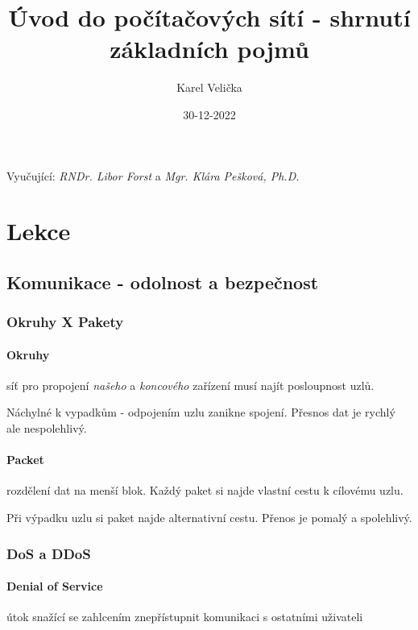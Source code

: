 \documentclass[10pt,a4paper]{article}
\title{Úvod do počítačových sítí - shrnutí základních pojmů}
\date{30-12-2022}
\author{Karel Velička}
\begin{document}
\maketitle

\begin{center}
    Vyučující: \textit{RNDr. Libor Forst} a \textit{Mgr. Klára Pešková, Ph.D.}
\end{center}

\tableofcontents

\newpage
{}

\section{Lekce}

\subsection{Komunikace - odolnost a bezpečnost}

\subsubsection{Okruhy X Pakety}
    
\paragraph{Okruhy} síť pro propojení \textit{našeho} a \textit{koncového} zařízení musí najít posloupnost uzlů. 

Náchylné k vypadkům - odpojením uzlu zanikne spojení. Přesnos dat je rychlý ale nespolehlivý.

\paragraph{Packet} rozdělení dat na menší blok. Každý paket si najde vlastní cestu k cílovému uzlu. 

Při výpadku uzlu si paket najde alternativní cestu. Přenos je pomalý a spolehlivý.

\subsubsection{DoS a DDoS}
\paragraph{Denial of Service} útok snažící se zahlcením znepřístupnit komunikaci s ostatními uživateli
\end{document}
